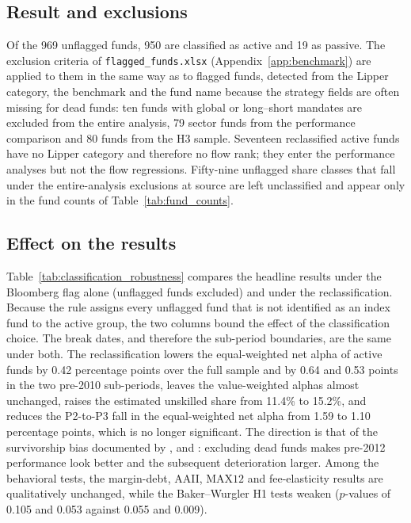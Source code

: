 \documentclass[12pt, oneside]{report}
\begin{document}
\subsection{Result and exclusions}

\noindent Of the 969 unflagged funds, 950 are
classified as active and 19 as passive. The exclusion criteria of
\texttt{flagged\_funds.xlsx} (Appendix~\ref{app:benchmark}) are applied
to them in the same way as to flagged funds, detected from the Lipper
category, the benchmark and the fund name because the strategy fields
are often missing for dead funds: ten funds with global or long--short
mandates are excluded from the entire analysis, 79 sector funds from the
performance comparison and 80 funds from the H3 sample. Seventeen
reclassified active funds have no Lipper category and therefore no flow
rank; they enter the performance analyses but not the flow regressions.
Fifty-nine unflagged share classes that fall under the entire-analysis
exclusions at source are left unclassified and appear only in the fund
counts of Table~\ref{tab:fund_counts}.

\subsection{Effect on the results}

\noindent Table~\ref{tab:classification_robustness}
compares the headline results under the Bloomberg flag alone (unflagged
funds excluded) and under the reclassification. Because the rule assigns
every unflagged fund that is not identified as an index fund to the
active group, the two columns bound the effect of the classification
choice. The break dates, and therefore the sub-period boundaries, are the
same under both. The reclassification lowers the equal-weighted net alpha
of active funds by 0.42 percentage points over the full sample and by
0.64 and 0.53 points in the two pre-2010 sub-periods, leaves the
value-weighted alphas almost unchanged, raises the estimated unskilled
share from 11.4\% to 15.2\%, and reduces the P2-to-P3 fall in the
equal-weighted net alpha from 1.59 to 1.10 percentage points, which is
no longer significant. The direction is that of the survivorship bias
documented by \textcite{BrownGoetzmannIbbotsonRoss1992},
\textcite{EltonGruberBlake1996} and
\textcite{CarhartCarpenterLynchMusto2002}: excluding dead funds makes
pre-2012 performance look better and the subsequent deterioration
larger. Among the behavioral tests, the margin-debt, AAII, $\text{MAX12}$
and fee-elasticity results are qualitatively unchanged, while the
Baker--Wurgler H1 tests weaken ($p$-values of 0.105 and 0.053 against
0.055 and 0.009).
\end{document}
